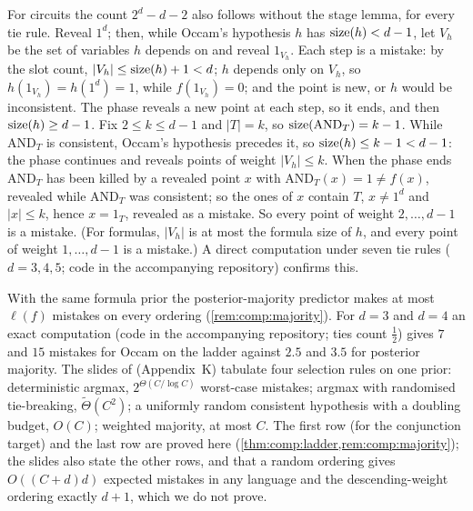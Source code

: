 \begin{remark}\label{rem:comp:adversary}
For circuits the count $2^d-d-2$ also follows without the stage lemma, for every tie rule. Reveal $1^d$; then, while Occam's hypothesis $h$ has $\operatorname{size}(h)<d-1$, let $V_h$ be the set of variables $h$ depends on and reveal $1_{V_h}$. Each step is a mistake: by the slot count, $|V_h|\le\operatorname{size}(h)+1<d$; $h$ depends only on $V_h$, so $h(1_{V_h})=h(1^d)=1$, while $f(1_{V_h})=0$; and the point is new, or $h$ would be inconsistent. The phase reveals a new point at each step, so it ends, and then $\operatorname{size}(h)\ge d-1$. Fix $2\le k\le d-1$ and $|T|=k$, so $\operatorname{size}(\mathrm{AND}_T)=k-1$. While $\mathrm{AND}_T$ is consistent, Occam's hypothesis precedes it, so $\operatorname{size}(h)\le k-1<d-1$: the phase continues and reveals points of weight $|V_h|\le k$. When the phase ends $\mathrm{AND}_T$ has been killed by a revealed point $x$ with $\mathrm{AND}_T(x)=1\ne f(x)$, revealed while $\mathrm{AND}_T$ was consistent; so the ones of $x$ contain $T$, $x\ne1^d$ and $|x|\le k$, hence $x=1_T$, revealed as a mistake. So every point of weight $2,\dots,d-1$ is a mistake. (For formulas, $|V_h|$ is at most the formula size of $h$, and every point of weight $1,\dots,d-1$ is a mistake.) A direct computation under seven tie rules ($d=3,4,5$; code in the accompanying repository) confirms this.
\end{remark}

\begin{remark}\label{rem:comp:selection}
With the same formula prior the posterior-majority predictor makes at most $\ell(f)$ mistakes on every ordering (\cref{rem:comp:majority}). For $d=3$ and $d=4$ an exact computation (code in the accompanying repository; ties count $\frac12$) gives $7$ and $15$ mistakes for Occam on the ladder against $2.5$ and $3.5$ for posterior majority. The slides of \citet{vaintrobhanni2026nnbayes} (Appendix~K) tabulate four selection rules on one prior: deterministic argmax, $2^{\Theta(C/\log C)}$ worst-case mistakes; argmax with randomised tie-breaking, $\tilde\Theta(C^2)$; a uniformly random consistent hypothesis with a doubling budget, $O(C)$; weighted majority, at most $C$. The first row (for the conjunction target) and the last row are proved here (\cref{thm:comp:ladder,rem:comp:majority}); the slides also state the other rows, and that a random ordering gives $O((C+d)d)$ expected mistakes in any language and the descending-weight ordering exactly $d+1$, which we do not prove.
\end{remark}

